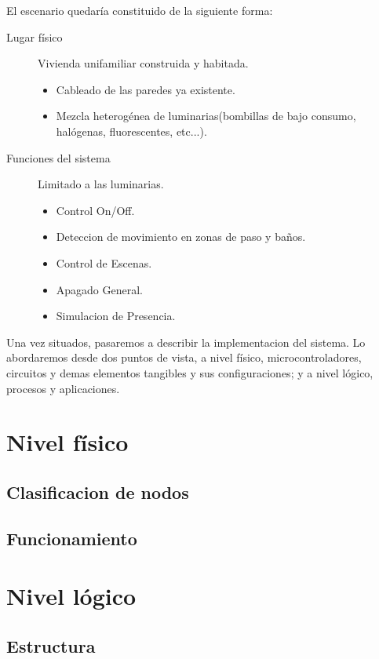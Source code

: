 El escenario quedaría constituido de la siguiente forma:
\begin{description}
    \item[Lugar físico] Vivienda unifamiliar construida y habitada.
        \begin{itemize}
            \item Cableado de las paredes ya existente.
            \item Mezcla heterogénea de luminarias(bombillas de bajo consumo, halógenas, fluorescentes, etc...).
        \end{itemize}
    \item[Funciones del sistema] Limitado a las luminarias.
        \begin{itemize}
            \item Control On/Off.
            \item Deteccion de movimiento en zonas de paso y baños.
            \item Control de Escenas.
            \item Apagado General.
            \item Simulacion de Presencia.
        \end{itemize}
\end{description}

Una vez situados, pasaremos a describir la implementacion del sistema. Lo abordaremos desde dos puntos de vista, a nivel físico, microcontroladores, circuitos y demas elementos tangibles y sus configuraciones; y a nivel lógico, procesos y aplicaciones.

 

\section{Nivel físico}
\subsection{Clasificacion de nodos}
\subsection{Funcionamiento}

\section{Nivel lógico}

\subsection{Estructura }
